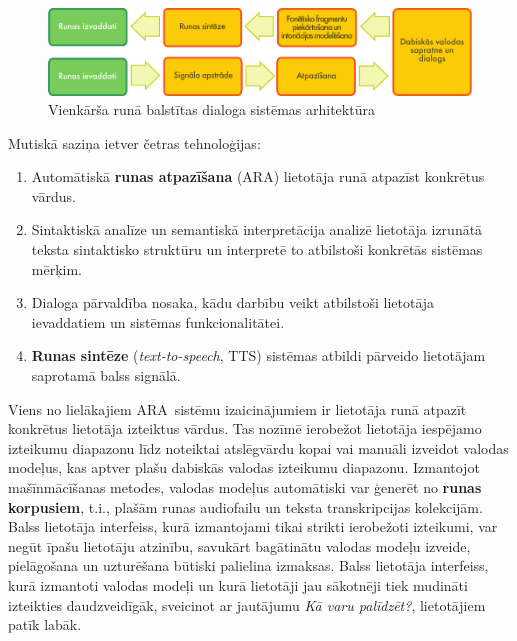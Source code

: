 \begin{multicols}{2}

\begin{figure}[htb]
  \center 
  \includegraphics[width=\textwidth]{../_media/latvian/simple_speech-based_dialogue_architecture}
  \caption{Vienkārša runā balstītas dialoga sistēmas arhitektūra}
  \label{fig:dialoguearch_de}
\end{figure}

Mutiskā saziņa ietver četras tehnoloģijas: 

\begin{enumerate}
\item  Automātiskā \textbf{runas atpazīšana} (ARA) lietotāja runā atpazīst konkrētus vārdus.
\item  Sintaktiskā analīze un semantiskā interpretācija analizē lietotāja izrunātā teksta sintaktisko struktūru un interpretē to atbilstoši konkrētās sistēmas mērķim.
\item  Dialoga pārvaldība nosaka, kādu darbību veikt atbilstoši lietotāja ievaddatiem un sistēmas funkcionalitātei.
\item  \textbf{Runas sintēze} (\textit{text-to-speech}, TTS) sistēmas atbildi pārveido lietotājam saprotamā balss signālā. 
\end{enumerate}

Viens no lielākajiem ARA~sistēmu izaicinājumiem ir lietotāja runā atpazīt konkrētus lietotāja izteiktus vārdus.
Tas nozīmē ierobežot lietotāja iespējamo izteikumu diapazonu līdz noteiktai atslēgvārdu kopai vai manuāli izveidot valodas modeļus, kas aptver plašu dabiskās valodas izteikumu diapazonu.
Izmantojot mašīnmācīšanas metodes, valodas modeļus automātiski var ģenerēt no \textbf{runas korpusiem}, t.i., plašām runas audiofailu un teksta transkripcijas kolekcijām. 
Balss lietotāja interfeiss, kurā izmantojami tikai strikti ierobežoti izteikumi, var negūt īpašu lietotāju atzinību, savukārt bagātinātu valodas modeļu izveide, pielāgošana un uzturēšana būtiski palielina izmaksas.
Balss lietotāja interfeiss, kurā izmantoti valodas modeļi un kurā lietotāji jau sākotnēji tiek mudināti izteikties daudzveidīgāk, sveicinot ar jautājumu \textit{Kā varu palīdzēt?}, lietotājiem patīk labāk. 


\end{multicols}

